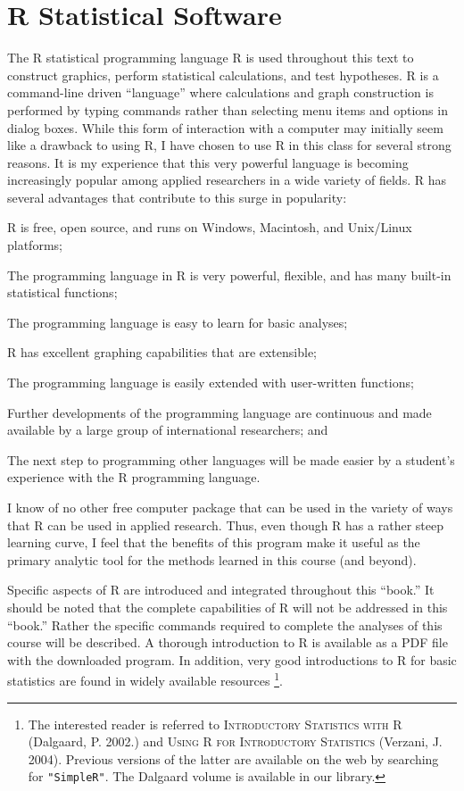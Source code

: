 \section*{R Statistical Software}
The R statistical programming language R is used throughout this text to construct graphics, perform statistical calculations, and test hypotheses.  R is a command-line driven ``language'' where calculations and graph construction is performed by typing commands rather than selecting menu items and options in dialog boxes.  While this form of interaction with a computer may initially seem like a drawback to using R, I have chosen to use R in this class for several strong reasons.  It is my experience that this very powerful language is becoming increasingly popular among applied researchers in a wide variety of fields.  R has several advantages that contribute to this surge in popularity:

\begin{Itemize}
  \item R is free, open source, and runs on Windows, Macintosh, and Unix/Linux platforms;
  \item The programming language in R is very powerful, flexible, and has many built-in statistical functions;
  \item The programming language is easy to learn for basic analyses;
  \item R has excellent graphing capabilities that are extensible;
  \item The programming language is easily extended with user-written functions;
  \item Further developments of the programming language are continuous and made available by a large group of international researchers; and
  \item The next step to programming other languages will be made easier by a student's experience with the R programming language.
\end{Itemize}

I know of no other free computer package that can be used in the variety of ways that R can be used in applied research.  Thus, even though R has a rather steep learning curve, I feel that the benefits of this program make it useful as the primary analytic tool for the methods learned in this course (and beyond).

Specific aspects of R are introduced and integrated throughout this ``book.''  It should be noted that the complete capabilities of R will not be addressed in this ``book.''  Rather the specific commands required to complete the analyses of this course will be described.  A thorough introduction to R is available as a PDF file with the downloaded program.  In addition, very good introductions to R for basic statistics are found in widely available resources \footnote{The interested reader is referred to \textsc{Introductory Statistics with R} (Dalgaard, P. 2002.) and \textsc{Using R for Introductory Statistics} (Verzani, J. 2004).  Previous versions of the latter are available on the web by searching for \verb+"SimpleR"+.  The Dalgaard volume is available in our library.}.

